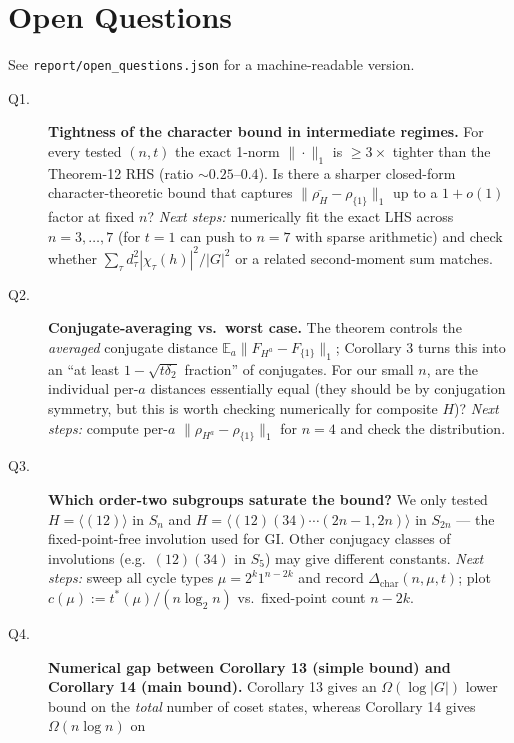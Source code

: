 \documentclass[11pt]{article}
\begin{document}
\section*{Open Questions}
See \texttt{report/open\_questions.json} for a machine-readable version.

\begin{description}
  \item[Q1.] \textbf{Tightness of the character bound in intermediate
        regimes.}  For every tested $(n,t)$ the exact 1-norm
        $\|\cdot\|_1$ is $\ge 3\times$ tighter than the Theorem-12 RHS
        (ratio $\sim 0.25$--$0.4$).  Is there a sharper closed-form
        character-theoretic bound that captures $\|\overline{\rho_H} -
        \rho_{\{1\}}\|_1$ up to a $1+o(1)$ factor at fixed $n$?
        \emph{Next steps:} numerically fit the exact LHS across
        $n=3,\ldots,7$ (for $t=1$ can push to $n=7$ with sparse
        arithmetic) and check whether $\sum_\tau d_\tau^2|\chi_\tau(h)|^2
        / |G|^2$ or a related second-moment sum matches.
  \item[Q2.] \textbf{Conjugate-averaging vs.\ worst case.}  The
        theorem controls the \emph{averaged} conjugate distance
        $\mathbb E_a \|F_{H^a} - F_{\{1\}}\|_1$; Corollary 3 turns
        this into an ``at least $1 - \sqrt{t\delta_2}$ fraction'' of
        conjugates.  For our small $n$, are the individual per-$a$
        distances essentially equal (they should be by conjugation
        symmetry, but this is worth checking numerically for
        composite $H$)? \emph{Next steps:} compute per-$a$
        $\|\rho_{H^a} - \rho_{\{1\}}\|_1$ for $n=4$ and check the
        distribution.
  \item[Q3.] \textbf{Which order-two subgroups saturate the bound?}
        We only tested $H = \langle (12) \rangle$ in $S_n$ and
        $H = \langle (12)(34)\cdots(2n-1,2n) \rangle$ in $S_{2n}$
        --- the fixed-point-free involution used for GI.  Other
        conjugacy classes of involutions (e.g.\ $(12)(34)$ in $S_5$)
        may give different constants.  \emph{Next steps:} sweep all
        cycle types $\mu = 2^k 1^{n-2k}$ and record
        $\Delta_{\text{char}}(n, \mu, t)$; plot $c(\mu) :=
        t^*(\mu)/(n\log_2 n)$ vs.\ fixed-point count $n-2k$.
  \item[Q4.] \textbf{Numerical gap between Corollary 13 (simple bound)
        and Corollary 14 (main bound).}  Corollary 13 gives an
        $\Omega(\log|G|)$ lower bound on the \emph{total} number of
        coset states, whereas Corollary 14 gives $\Omega(n\log n)$ on

\end{description}
\end{document}
